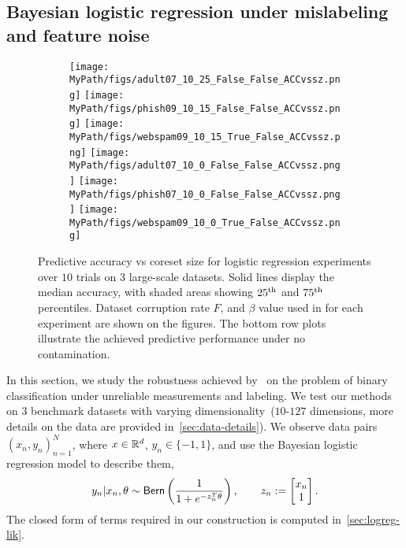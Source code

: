 \subsection{Bayesian logistic regression under mislabeling and feature noise}
\label{subsec:logreg-expt}

\begin{figure}[!ht]
	\begin{subfigure}[]{0.995\textwidth} 
		\centering
		\texttt{[image: \\MyPath/figs/adult07\_10\_25\_False\_False\_ACCvssz.png]}
		\centering
		\hfill
		\texttt{[image: \\MyPath/figs/phish09\_10\_15\_False\_False\_ACCvssz.png]}
		\centering
		\hfill
		\texttt{[image: \\MyPath/figs/webspam09\_10\_15\_True\_False\_ACCvssz.png]}
		\centering
		\texttt{[image: \\MyPath/figs/adult07\_10\_0\_False\_False\_ACCvssz.png]}
		\centering
		\hfill
		\texttt{[image: \\MyPath/figs/phish07\_10\_0\_False\_False\_ACCvssz.png]}
		\centering
		\hfill
		\texttt{[image: \\MyPath/figs/webspam09\_10\_0\_True\_False\_ACCvssz.png]}
	\end{subfigure}	
	\centering
	\caption{Predictive accuracy vs coreset size for logistic regression experiments over $10$ trials on $3$ large-scale datasets. Solid lines display the median accuracy, with shaded areas showing $25\textsuperscript{th}$ and $75\textsuperscript{th}$ percentiles. Dataset corruption rate $F$, and $\beta$ value used in \bcores{} for each experiment are shown on the figures. The bottom row plots illustrate the achieved predictive performance under no contamination.}
	\label{fig:logreg_plot}
\end{figure}

In this section, we study the robustness achieved by~\bcores{} on the problem of binary classification  under unreliable measurements and labeling. We test our methods on 3 benchmark datasets with varying dimensionality~($10$-$127$ dimensions, more details on the data are provided in~\cref{sec:data-details}). We observe data pairs $(x_n, y_n)_{n=1}^{N}$, where $x\in\mathbb{R}^{d}$, $y_n \in \{-1,1\}$, and use the Bayesian logistic regression model to describe them,
\[
y_n | x_n, \theta \sim {\sf{Bern}} \left( \frac{1}{1+e^{-z_n^T \theta}}\right),
\qquad 
z_n:=\begin{bmatrix}
x_n \\
1
\end{bmatrix}.
\]
The closed form of \blik{} terms required in our construction is computed in~\cref{sec:logreg-lik}. 

